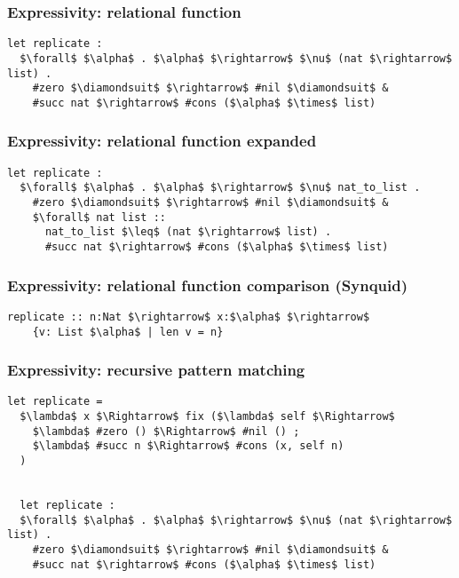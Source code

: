 \documentclass{beamer}
\begin{document}
\begin{frame}[fragile]
  \frametitle{Expressivity: relational function}

  \begin{lstlisting}[]
  let replicate : 
  $\forall$ $\alpha$ . $\alpha$ $\rightarrow$ $\nu$ (nat $\rightarrow$ list) .
    #zero $\diamondsuit$ $\rightarrow$ #nil $\diamondsuit$ & 
    #succ nat $\rightarrow$ #cons ($\alpha$ $\times$ list)
  \end{lstlisting}


\end{frame}

\begin{frame}[fragile]

  \frametitle{Expressivity: relational function expanded}

  \begin{lstlisting}[]
  let replicate : 
  $\forall$ $\alpha$ . $\alpha$ $\rightarrow$ $\nu$ nat_to_list .
    #zero $\diamondsuit$ $\rightarrow$ #nil $\diamondsuit$ & 
    $\forall$ nat list :: 
      nat_to_list $\leq$ (nat $\rightarrow$ list) .
      #succ nat $\rightarrow$ #cons ($\alpha$ $\times$ list)
  \end{lstlisting}

\end{frame}

\begin{frame}[fragile]

  \frametitle{Expressivity: relational function comparison (Synquid)}

  \begin{lstlisting}[keywords={termination, measure, data, where}]
  replicate :: n:Nat $\rightarrow$ x:$\alpha$ $\rightarrow$ 
    {v: List $\alpha$ | len v = n}

  \end{lstlisting}

  \hfill
\end{frame}

\begin{frame}[fragile]
  \frametitle{Expressivity: recursive pattern matching}
  \begin{lstlisting}[]
  let replicate = 
  $\lambda$ x $\Rightarrow$ fix ($\lambda$ self $\Rightarrow$
    $\lambda$ #zero () $\Rightarrow$ #nil () ;
    $\lambda$ #succ n $\Rightarrow$ #cons (x, self n)
  )


  let replicate : 
  $\forall$ $\alpha$ . $\alpha$ $\rightarrow$ $\nu$ (nat $\rightarrow$ list) .
    #zero $\diamondsuit$ $\rightarrow$ #nil $\diamondsuit$ & 
    #succ nat $\rightarrow$ #cons ($\alpha$ $\times$ list)
  \end{lstlisting}
\end{frame}
\end{document}
